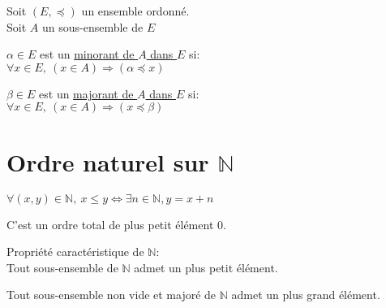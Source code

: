 \documentclass[12pt,twoside,a4paper]{article}
\begin{document}
		\begin{defi}
			Soit $(E,\preccurlyeq)$ un ensemble ordonn\'e.\\
			Soit $A$ un sous-ensemble de $E$
			\begin{liste}
				\item $\alpha\in E$ est un \underline{minorant de $A$ dans $E$} si:\\
					$\forall x\in E,\ (x\in A)\Rightarrow(\alpha\preccurlyeq x)$
				\item $\beta\in E$ est un \underline{majorant de $A$ dans $E$} si:\\
					$\forall x\in E,\ (x\in A)\Rightarrow(x\preccurlyeq\beta)$
			\end{liste}
		\end{defi}
	\section{Ordre naturel sur $\mathbb{N}$}
		\begin{defi}
			$\forall(x,y)\in \mathbb{N},\ x\leqslant y\iff\exists n\in\mathbb{N}, y=x+n$
		\end{defi}
		C'est un ordre total de plus petit \'el\'ement $0$.
		\begin{prop}
			Propri\'et\'e caract\'eristique de $\mathbb{N}$:\\
			Tout sous-ensemble de $\mathbb{N}$ admet un plus petit \'el\'ement.
		\end{prop}
		\begin{coro}
			Tout sous-ensemble non vide et major\'e de $\mathbb{N}$ admet un plus grand \'el\'ement.
		\end{coro}
\end{document}
